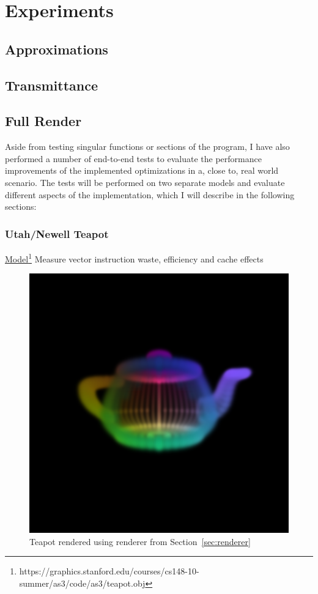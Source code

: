 \documentclass[a4paper, 11pt]{memoir}
\begin{document}
    \chapter{Experiments}
    \label{ch:experiments}
    \section{Approximations}
    \section{Transmittance}
    \section{Full Render}
    Aside from testing singular functions or sections of the program, I have also performed a number of end-to-end tests
    to evaluate the performance improvements of the implemented optimizations in a, close to, real world scenario.
    The tests will be performed on two separate models and evaluate different aspects of the implementation,
    which I will describe in the following sections:
    \subsection{Utah/Newell Teapot}
    \href{https://graphics.stanford.edu/courses/cs148-10-summer/as3/code/as3/teapot.obj}{Model}\footnote{https://graphics.stanford.edu/courses/cs148-10-summer/as3/code/as3/teapot.obj}
    Measure vector instruction waste, efficiency and cache effects

    \begin{figure}[H]
        \centering
        \includegraphics[scale=.2]{images/teapot.png}
        \caption{Teapot rendered using renderer from Section~\ref{sec:renderer}}
        \label{fig:teapot_render}
    \end{figure}
\end{document}
